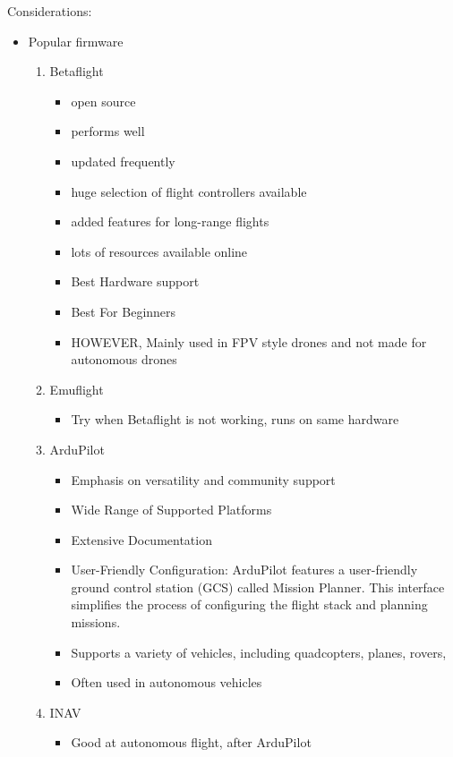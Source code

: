 Considerations:
	\begin{itemize}
		\item Popular firmware
			\begin{enumerate}
				\item Betaflight
					\begin{itemize}
						\item open source
						\item performs well
						\item updated frequently
						\item huge selection of flight controllers available
						\item added features for long-range flights
						\item lots of resources available online
						\item Best Hardware support
						\item Best For Beginners
						\item HOWEVER, Mainly used in FPV style drones and not made for autonomous drones
					\end{itemize}
				\item Emuflight
					\begin{itemize}
						\item Try when Betaflight is not working, runs on same hardware
					\end{itemize}
				\item ArduPilot
					\begin{itemize}
						\item Emphasis on versatility and community support
						\item Wide Range of Supported Platforms
						\item Extensive Documentation
						\item User-Friendly Configuration: ArduPilot features a user-friendly ground control station (GCS) called Mission Planner. This interface simplifies the process of configuring the flight stack and planning missions.
						\item Supports a variety of vehicles, including quadcopters, planes, rovers, 
						\item Often used in autonomous vehicles
					\end{itemize}
				\item INAV
					\begin{itemize}
						\item Good at autonomous flight, after ArduPilot
					\end{itemize}

\end{enumerate}
\end{itemize}
